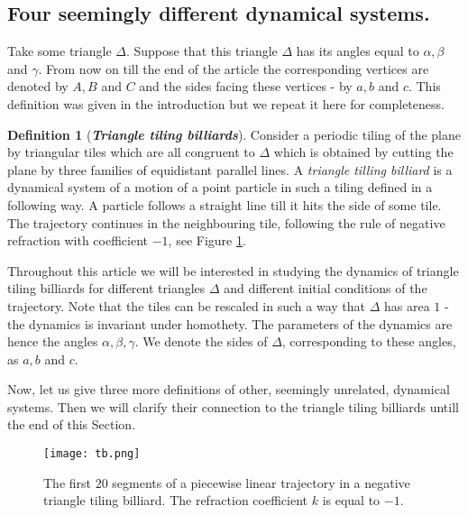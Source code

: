 \documentclass[12pt]{article}
\theoremstyle{definition}
\newtheorem{definition}{Definition}
\begin{document}
\subsection{Four seemingly different dynamical systems.}\label{subs:definitions}

Take some triangle $\Delta$. Suppose that this triangle $\Delta$ has its angles equal to $\alpha, \beta$ and $\gamma$. From now on till the end of the article the corresponding vertices are denoted by $A,B$ and $C$ and the sides facing these vertices - by $a,b$ and $c$. This definition was given in the introduction but we repeat it here for completeness.

\begin{definition}[\textbf{\emph{Triangle tiling billiards}}]\label{def:triangle_tiling_billiards_1}
Consider a periodic tiling of the plane by triangular tiles which are all congruent to $\Delta$ which is obtained by cutting the plane by three families of equidistant parallel lines. A \emph{triangle tilling billiard} is a dynamical system of a motion of a point particle in such a tiling defined in a following way. A particle follows a straight line till it hits the side of some tile. The trajectory continues in the neighbouring tile, following the rule of negative refraction with coefficient $-1$, see Figure \ref{fig:triangletiling}. 
\end{definition}

Throughout this article we will be interested in studying the dynamics of triangle tiling billiards for different triangles $\Delta$ and different initial conditions of the trajectory. Note that the tiles can be rescaled in such a way that $\Delta$ has area $1$ - the dynamics is invariant under homothety. The parameters of the dynamics are hence the angles $\alpha, \beta, \gamma$. We denote the sides of $\Delta$, corresponding to these angles, as $a,b$ and $c$. 

\smallskip

Now, let us give three more definitions of other, seemingly unrelated, dynamical systems. Then we will clarify their connection to the triangle tiling billiards untill the end of this Section.

\begin{figure}
\centering
\texttt{[image: tb.png]}
\caption[]{
The first $20$ segments of a piecewise linear trajectory in a negative triangle tiling billiard. The refraction coefficient $k$ is equal to $-1$.}\label{fig:triangletiling}
\end{figure}
\end{document}
